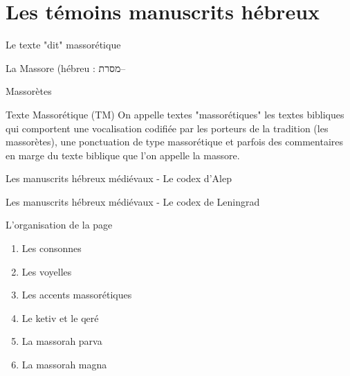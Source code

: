 \documentclass[11pt]{beamer}
\begin{document}
\begin{frame}
	\titlepage
\end{frame}

\section*{Les témoins manuscrits hébreux}

\begin{frame}{Le texte "dit" massorétique}

\begin{alertblock}{La Massore (hébreu : \texthebrew{מסרת}–}    
\end{alertblock}

\begin{alertblock}{Massorètes}
\end{alertblock}

\begin{alertblock}{Texte Massorétique (TM)}
      On appelle textes "massorétiques" les textes bibliques qui comportent une vocalisation codifiée par les porteurs de la tradition (les massorètes), une ponctuation de type massorétique et parfois des commentaires en marge du texte biblique que l'on appelle la massore.   
\end{alertblock}
\end{frame}

\begin{frame}{Les manuscrits hébreux médiévaux -  Le codex d'Alep}
\end{frame}

\begin{frame}{Les manuscrits hébreux médiévaux -  Le codex de Leningrad}
\end{frame}

\begin{frame}{L'organisation de la page}
\begin{block}{}
    \begin{enumerate}
        \item Les consonnes
        \item Les voyelles
        \item Les accents massorétiques
        \item Le ketiv et le qeré
        \item La massorah parva
        \item La massorah magna
    \end{enumerate}    
\end{block}
\end{frame}
\end{document}

